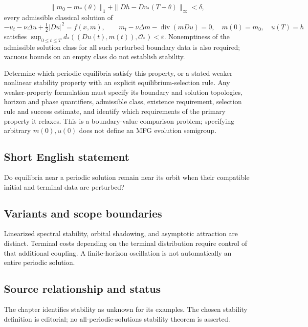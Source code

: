 \documentclass[11pt,a4paper]{article}
\begin{document}
\[
 \|m_0-m_*(\theta)\|_1+\|Dh-Dv_*(T+\theta)\|_\infty<\delta,
\]
every admissible classical solution of
\[
 -u_t-\nu\Delta u+\tfrac12|Du|^2=f(x,m),\qquad
 m_t-\nu\Delta m-\operatorname{div}(mDu)=0,
 \quad m(0)=m_0,\quad u(T)=h
\]
satisfies $\sup_{0\leq t\leq T}d_*((Du(t),m(t)),\mathcal O_*)<\varepsilon$. Nonemptiness of the admissible solution class for all such perturbed boundary data is also required; vacuous bounds on an empty class do not establish stability.

Determine which periodic equilibria satisfy this property, or a stated weaker nonlinear stability property with an explicit equilibrium-selection rule. Any weaker-property formulation must specify its boundary and solution topologies, horizon and phase quantifiers, admissible class, existence requirement, selection rule and success estimate, and identify which requirements of the primary property it relaxes. This is a boundary-value comparison problem; specifying arbitrary $m(0),u(0)$ does not define an MFG evolution semigroup.
\subsection*{Short English statement}
Do equilibria near a periodic solution remain near its orbit when their compatible initial and terminal data are perturbed?
\subsection*{Variants and scope boundaries}
Linearized spectral stability, orbital shadowing, and asymptotic attraction are distinct. Terminal costs depending on the terminal distribution require control of that additional coupling. A finite-horizon oscillation is not automatically an entire periodic solution.
\subsection*{Source relationship and status}
The chapter identifies stability as unknown for its examples. The chosen stability definition is editorial; no all-periodic-solutions stability theorem is asserted.
\end{document}
